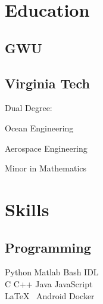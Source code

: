 \documentclass[letterpaper]{deedy-resume} %
\begin{document}
\begin{minipage}[t]{0.30\textwidth} %


\section{Education} 

\subsection{GWU}


\sectionspace %



\subsection{Virginia Tech}


Dual Degree: \\
\begin{tightitemize}
\vspace{\topsep}
\item Ocean Engineering
\item Aerospace Engineering
\end{tightitemize}
Minor in Mathematics \\


\sectionspace %


\section{Skills}

\subsection{Programming}

   Python \textbullet{} Matlab \textbullet{} Bash \textbullet{} IDL \\ 
   C \textbullet{} C++ \textbullet{} Java \textbullet{} JavaScript \\
   \LaTeX\ \textbullet{} Android \textbullet{} Docker


\end{minipage}
\end{document}

